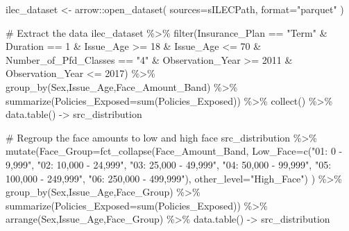 \documentclass[
  letterpaper,
  DIV=11,
  numbers=noendperiod]{scrartcl}
\newenvironment{Shaded}{\begin{snugshade}}{\end{snugshade}}
\newcommand{\AttributeTok}[1]{\textcolor[rgb]{0.40,0.45,0.13}{#1}}
\newcommand{\CommentTok}[1]{\textcolor[rgb]{0.37,0.37,0.37}{#1}}
\newcommand{\DecValTok}[1]{\textcolor[rgb]{0.68,0.00,0.00}{#1}}
\newcommand{\FunctionTok}[1]{\textcolor[rgb]{0.28,0.35,0.67}{#1}}
\newcommand{\NormalTok}[1]{\textcolor[rgb]{0.00,0.23,0.31}{#1}}
\newcommand{\OtherTok}[1]{\textcolor[rgb]{0.00,0.23,0.31}{#1}}
\newcommand{\SpecialCharTok}[1]{\textcolor[rgb]{0.37,0.37,0.37}{#1}}
\newcommand{\StringTok}[1]{\textcolor[rgb]{0.13,0.47,0.30}{#1}}
\begin{document}
\begin{Shaded}
\begin{Highlighting}[]
\NormalTok{ilec\_dataset }\OtherTok{\textless{}{-}}\NormalTok{ arrow}\SpecialCharTok{::}\FunctionTok{open\_dataset}\NormalTok{(}
  \AttributeTok{sources=}\NormalTok{sILECPath,}
  \AttributeTok{format=}\StringTok{"parquet"}
\NormalTok{)}

\CommentTok{\# Extract the data}
\NormalTok{ilec\_dataset }\SpecialCharTok{\%\textgreater{}\%}
  \FunctionTok{filter}\NormalTok{(Insurance\_Plan }\SpecialCharTok{==} \StringTok{"Term"} \SpecialCharTok{\&}
\NormalTok{           Duration }\SpecialCharTok{==} \DecValTok{1} \SpecialCharTok{\&}
\NormalTok{           Issue\_Age }\SpecialCharTok{\textgreater{}=} \DecValTok{18} \SpecialCharTok{\&}
\NormalTok{           Issue\_Age }\SpecialCharTok{\textless{}=} \DecValTok{70} \SpecialCharTok{\&}
\NormalTok{           Number\_of\_Pfd\_Classes }\SpecialCharTok{==} \StringTok{"4"} \SpecialCharTok{\&}
\NormalTok{           Observation\_Year }\SpecialCharTok{\textgreater{}=} \DecValTok{2011} \SpecialCharTok{\&}
\NormalTok{           Observation\_Year }\SpecialCharTok{\textless{}=} \DecValTok{2017}\NormalTok{) }\SpecialCharTok{\%\textgreater{}\%}
  \FunctionTok{group\_by}\NormalTok{(Sex,Issue\_Age,Face\_Amount\_Band) }\SpecialCharTok{\%\textgreater{}\%}
  \FunctionTok{summarize}\NormalTok{(}\AttributeTok{Policies\_Exposed=}\FunctionTok{sum}\NormalTok{(Policies\_Exposed)) }\SpecialCharTok{\%\textgreater{}\%}
  \FunctionTok{collect}\NormalTok{() }\SpecialCharTok{\%\textgreater{}\%}
  \FunctionTok{data.table}\NormalTok{() }\OtherTok{{-}\textgreater{}}
\NormalTok{  src\_distribution}

\CommentTok{\# Regroup the face amounts to low and high face}
\NormalTok{src\_distribution }\SpecialCharTok{\%\textgreater{}\%}
  \FunctionTok{mutate}\NormalTok{(}\AttributeTok{Face\_Group=}\FunctionTok{fct\_collapse}\NormalTok{(Face\_Amount\_Band,}
                                 \AttributeTok{Low\_Face=}\FunctionTok{c}\NormalTok{(}\StringTok{"01: 0 {-} 9,999"}\NormalTok{,}
                                            \StringTok{"02: 10,000 {-} 24,999"}\NormalTok{,}
                                            \StringTok{"03: 25,000 {-} 49,999"}\NormalTok{,}
                                            \StringTok{"04: 50,000 {-} 99,999"}\NormalTok{,}
                                            \StringTok{"05: 100,000 {-} 249,999"}\NormalTok{,}
                                            \StringTok{"06: 250,000 {-} 499,999"}\NormalTok{),}
                                 \AttributeTok{other\_level=}\StringTok{"High\_Face"}\NormalTok{)}
\NormalTok{  ) }\SpecialCharTok{\%\textgreater{}\%}
  \FunctionTok{group\_by}\NormalTok{(Sex,Issue\_Age,Face\_Group) }\SpecialCharTok{\%\textgreater{}\%}
  \FunctionTok{summarize}\NormalTok{(}\AttributeTok{Policies\_Exposed=}\FunctionTok{sum}\NormalTok{(Policies\_Exposed)) }\SpecialCharTok{\%\textgreater{}\%}
  \FunctionTok{arrange}\NormalTok{(Sex,Issue\_Age,Face\_Group) }\SpecialCharTok{\%\textgreater{}\%}
  \FunctionTok{data.table}\NormalTok{() }\OtherTok{{-}\textgreater{}}
\NormalTok{  src\_distribution}


\end{Highlighting}
\end{Shaded}
\end{document}
